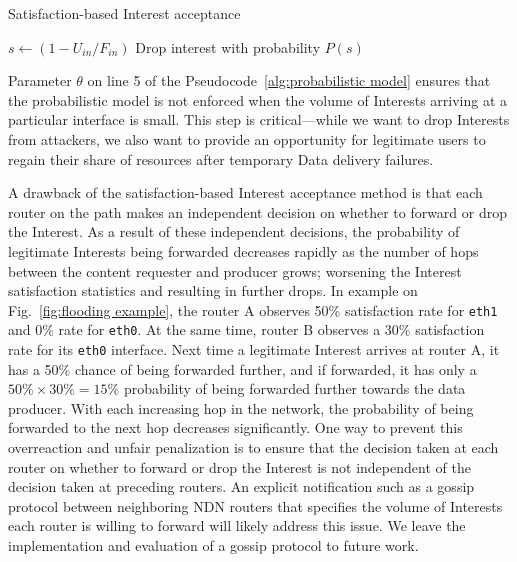 \begin{algorithm}[h]
\footnotesize
\caption{\small Satisfaction-based Interest acceptance}
\label{alg:probabilistic model}
\begin{algorithmic}[1]
\State{} 

\vspace{0.1cm}

    \State{} 
    \State{} 
    
     
        \State $s \leftarrow (1 - U_{in} / F_{in})$
        \State Drop interest with probability $P(s)$
    \EndIf

\EndFunction

\end{algorithmic}
\end{algorithm}

Parameter $\theta$ on line 5 of the Pseudocode~\ref{alg:probabilistic model} ensures that the probabilistic model is not enforced when the volume of Interests arriving at a particular interface is small. This step is critical---while we want to drop Interests from attackers, we also want to provide an opportunity for legitimate users to regain their share of resources after temporary Data delivery failures.

A drawback of the satisfaction-based Interest acceptance method is that each router on the path makes an independent decision on whether to forward or drop the Interest. 
As a result of these independent decisions,  the probability of legitimate Interests being forwarded decreases rapidly as the number of hops between the content requester and producer grows; worsening the Interest satisfaction statistics and resulting in further drops.
In example on Fig.~\ref{fig:flooding example}, the router A observes 50\% satisfaction rate for \texttt{eth1} and 0\% rate for \texttt{eth0}. 
At the same time, router B observes a 30\% satisfaction rate for its \texttt{eth0} interface.
Next time a legitimate Interest arrives at router A, it has a 50\% chance of being forwarded further, and if forwarded, it has only a $50\% \times 30\% = 15\%$ probability of being forwarded further towards the data producer. With each increasing hop in the network, the probability of being forwarded to the next hop decreases significantly. 
One way to prevent this overreaction and unfair penalization is to ensure that the decision taken at each router on whether to forward or drop the Interest is not independent of the decision taken at preceding routers. An explicit notification such as a gossip protocol between neighboring NDN routers that specifies the volume of Interests each router is willing to forward will likely address this issue. We leave the implementation and evaluation of a gossip protocol to future work.

